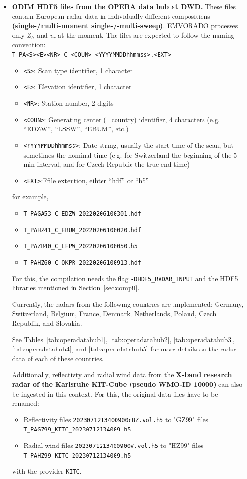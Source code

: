 \documentclass[10pt,a4paper,twoside,headinclude,footinclude,parskip=half]{scrartcl}
\newcommand{\srcform}[1]{\mbox{\texttt{#1}}\xspace}%
\begin{document}
\begin{itemize}
\item \textbf{ODIM HDF5 files from the OPERA data hub at DWD.} These files contain European radar data in individually different compositions \textbf{(single-/multi-moment single-/-multi-sweep)}.
  EMVORADO processes only $Z_h$ and $v_r$ at the moment. The files are expected to follow the naming convention:\\[0.5em]
  \verb$T_PA<S><E><NR>_C_<COUN>_<YYYYMMDDhhmmss>.<EXT>$
  \begin{itemize}
  \item \verb|<S>|: Scan type identifier, 1 character
  \item \verb|<E>|: Elevation identifier, 1 character
  \item \verb|<NR>|: Station number, 2 digits
  \item \verb|<COUN>|: Generating center (=country) identifier, 4 characters (e.g. ``EDZW'', ``LSSW'', ``EBUM'', etc.)
  \item \verb|<YYYYMMDDhhmmss>|: Date string, usually the start time of the scan, but sometimes the nominal time (e.g. for Switzerland the beginning of the 5-min interval, and for Czech Republic the true end time)
  \item \verb|<EXT>|:Ffile extention, eihter ``hdf'' or ``h5''
  \end{itemize}
  for example,
  \begin{itemize}
  \item \verb|T_PAGA53_C_EDZW_20220206100301.hdf|
  \item \verb|T_PAHZ41_C_EBUM_20220206100020.hdf|
  \item \verb|T_PAZB40_C_LFPW_20220206100050.h5|
  \item \verb|T_PAHZ60_C_OKPR_20220206100913.hdf|
  \end{itemize}
  For this, the compilation needs the flag \srcform{-DHDF5_RADAR_INPUT} and the HDF5 libraries mentioned in Section~\ref{sec:compil}.

  Currently, the radars from the following countries are implemented:
  Germany, Switzerland, Belgium, France, Denmark, Netherlands, Poland, Czech Republik, and Slovakia.

  See Tables~\ref{tab:operadatahub1}, \ref{tab:operadatahub2}, \ref{tab:operadatahub3}, \ref{tab:operadatahub4}, and \ref{tab:operadatahub5} for more details on the radar data of each of these countries.

  Additionally, reflectivty and radial wind data from the \textbf{X-band research radar of the Karlsruhe KIT-Cube (pseudo WMO-ID 10000)} can also be ingested in this context. For this, the original data files have to be renamed:
  \begin{itemize}
  \item Reflectivity files \verb|2023071213400900dBZ.vol.h5| to "GZ99" files \verb|T_PAGZ99_KITC_20230712134009.h5|
  \item Radial wind files \verb|2023071213400900V.vol.h5| to "HZ99" files \verb|T_PAHZ99_KITC_20230712134009.h5|
  \end{itemize}
  with the provider \verb|KITC|.


\end{itemize}
\end{document}
